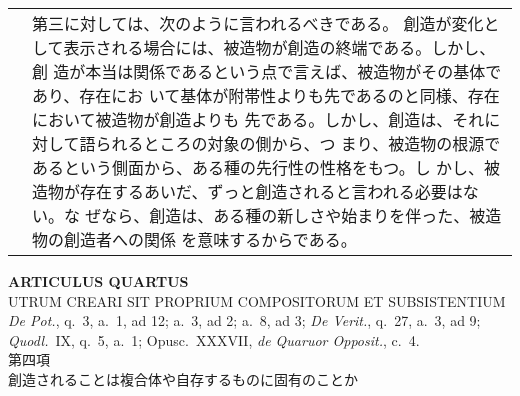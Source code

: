 \documentclass[10pt]{jsarticle} %
\begin{document}
\begin{longtable}{p{21em}p{21em}}
&

第三に対しては、次のように言われるべきである。
創造が変化として表示される場合には、被造物が創造の終端である。しかし、創
 造が本当は関係であるという点で言えば、被造物がその基体であり、存在にお
 いて基体が附帯性よりも先であるのと同様、存在において被造物が創造よりも
 先である。しかし、創造は、それに対して語られるところの対象の側から、つ
 まり、被造物の根源であるという側面から、ある種の先行性の性格をもつ。し
 かし、被造物が存在するあいだ、ずっと創造されると言われる必要はない。な
 ぜなら、創造は、ある種の新しさや始まりを伴った、被造物の創造者への関係
 を意味するからである。


\\

\end{longtable}
\newpage


\begin{center}
 {\Large {\bf ARTICULUS QUARTUS}}\\
 {\large UTRUM CREARI SIT PROPRIUM COMPOSITORUM ET SUBSISTENTIUM}\\
 {\footnotesize {\itshape De Pot.}, q.~3, a.~1, ad 12; a.~3, ad 2; a.~8,
 ad 3; {\itshape De Verit.}, q.~27, a.~3, ad 9; {\itshape Quodl.}~IX,
 q.~5, a.~1; Opusc.~XXXVII, {\itshape de Quaruor Opposit.}, c.~4.}\\
 {\Large 第四項\\創造されることは複合体や自存するものに固有のことか}
\end{center}
\end{document}
